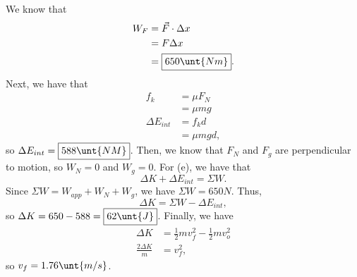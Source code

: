 \documentclass[11pt]{article}
\begin{document}
\begin{solution}
	We know that
	\begin{align*}
		W_{F} &= \vec{F} \cdot \Delta x \\
		&= F\Delta x \\
		&= \boxed{650\unt{Nm}}.
	\end{align*}
	Next, we have that
	\begin{align*}
		f_k &= \mu F_N \\
		&= \mu mg \\
		\Delta E_{int} &= f_k d \\
		&= \mu mgd,
	\end{align*}
	so $\Delta E_{int} = \boxed{588\unt{NM}}$. Then, we know that $F_N$ and $F_g$ are perpendicular to motion, so $W_N = \boxed{0}$ and $W_g = \boxed{0}$. For (e), we have that
	\[\Delta K + \Delta E_{int} = \Sigma W.\]
	Since $\Sigma W = W_{app} + W_N + W_g$, we have $\Sigma W = 650 N$. Thus,
	\[\Delta K = \Sigma W - \Delta E_{int},\]
	so $\Delta K = 650 - 588 = \boxed{62\unt{J}}$. Finally, we have
	\begin{align*}
		\Delta K &= \frac{1}{2}mv_f^2 - \frac{1}{2}mv_o^2 \\
		\frac{2\Delta K}{m} &= v_f^2,
	\end{align*}
	so $v_f = 1.76 \unt{m/s}$.
\end{solution}
\end{document}
